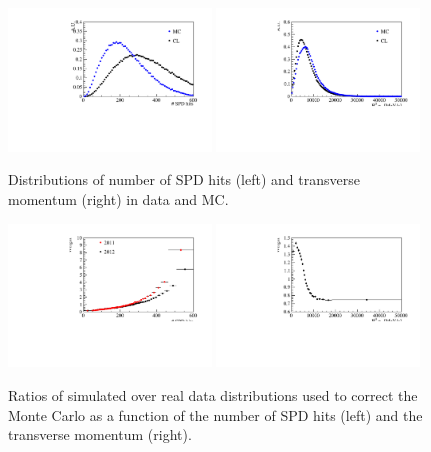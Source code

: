 \begin{figure}[h!]
\centering
\includegraphics[width=0.48\textwidth]{RKst/figs/nspd_12.pdf}
\includegraphics[width=0.48\textwidth]{RKst/figs/bpt.pdf}
\caption{Distributions of number of SPD hits (left) and \Bz transverse momentum (right) in data and MC.}
\label{fig:b0pt_nSPD_distrib}
\end{figure}

\begin{figure}[h!]
\centering
\includegraphics[width=0.48\textwidth]{RKst/figs/nspd_w.pdf}
\includegraphics[width=0.48\textwidth]{RKst/figs/bpt_w.pdf}
\caption{ Ratios of simulated over real data distributions used to correct the Monte Carlo
as a function of the number of SPD hits (left) and the \Bz transverse momentum (right). }
\label{fig:b0pt_nSPD_ratios}
\end{figure}



